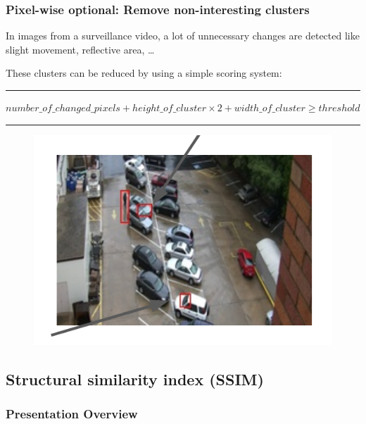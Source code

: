 \documentclass[13.5pt,aspecratio=169, xcolor=dvipsnames]{beamer}
\begin{document}


\begin{frame}
    \onehalfspacing
        \frametitle{Pixel-wise optional: Remove non-interesting clusters
        }
        \begin{block}{}
            In images from a surveillance video, a lot of unnecessary changes are detected like slight movement, reflective area, …
        \end{block}

        These clusters can be reduced by using a simple scoring system:

        \hspace{4em}\rule{0.7\textwidth}{0.4pt}
        \vspace{-0.5em}
        {\small
        \begin{center}
            $ number\_of\_changed\_pixels + height\_of\_cluster \times 2 + width\_of\_cluster \geq threshold $
        \end{center}
        }
        \vspace{-1em}
        \hspace{4em}\rule{0.7\textwidth}{0.4pt}


            \begin{figure}
                \centering
                \includegraphics[width=0.55\linewidth]{Remove_non_interesting_clusters.png}
             \end{figure}
      
\end{frame}
    


\subsection{Structural similarity index (SSIM)}

\begin{frame}
    \frametitle{Presentation Overview}
    \tableofcontents[currentsubsection, sectionstyle=show/shaded, subsectionstyle=show/shaded]
\end{frame}
\end{document}
